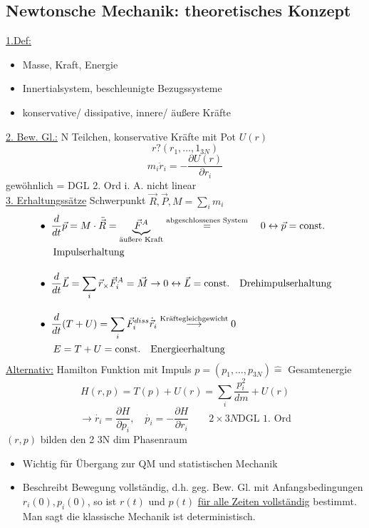 \documentclass[titlepage,12pt,a4paper,ngerman]{report}
\begin{document}
{\subsection*{Newtonsche Mechanik: theoretisches Konzept}
\underline{1.Def:}
\begin{itemize}
	\item Masse, Kraft, Energie
	\item Innertialsystem, beschleunigte Bezugssysteme
	\item konservative/ dissipative, innere/ äußere Kräfte
\end{itemize}
\underline{2. Bew. Gl.:}
N Teilchen, konservative Kräfte mit Pot $U(r)$
$$ r ? (r_1, \dots, 1_{3N})$$
$$m_i\ddot{r}_i = - \frac{\partial U(r)}{\partial r_i}$$ 
gewöhnlich = DGL 2. Ord i. A. nicht linear\\
\underline{3. Erhaltungssätze}
Schwerpunkt $\vec{R}, \vec{P}, M = \sum_i m_i$
\begin{align*}
&\bullet \ \frac{d}{dt} \vec{p} = M \cdot \ddot{\vec{R}} = \underbrace{\vec{F}^A} _{\textrm{äußere Kraft}} \buildrel \textrm{abgeschlossenes System} \over = \quad 0 \leftrightarrow \vec{p} = \textrm{const.} \\
&\indent \textrm{Impulserhaltung}\\[10pt]
&\bullet \ \frac{d}{dt} \vec{L} = \sum_i \vec{r}_ \times \vec{F}_i^A = \vec{M} \rightarrow 0 \leftrightarrow \vec{L} = \textrm{const.} \quad \textrm{Drehimpulserhaltung}\\[10pt]
&\bullet \ \frac{d}{dt} (T + U) = \sum_i \vec{F}_i^{diss} \dot{\vec{r}}_i \buildrel\textrm{Kräftegleichgewicht} \over \longrightarrow 0\\
&\indent E = T+U = \textrm{const.} \quad \textrm{Energieerhaltung}
\end{align*}
\underline{Alternativ:}
Hamilton Funktion mit Impuls $p=(p_1,\dots, p_{3N}) \widehat{=}$ Gesamtenergie
$$H(r,p) = T(p) + U(r) = \sum_i \frac{p_i^2}{dm} + U(r)$$
$$\rightarrow \dot{r_i} = \frac{\partial H}{\partial p_i}, \quad \dot{p_i}= -\frac{\partial H}{\partial r_i} \qquad 2\times 3 N \textrm{DGL 1. Ord}$$
$(r,p)$ bilden den 2 3N dim Phasenraum
\begin{itemize}
	\item Wichtig für Übergang zur QM und statistischen Mechanik
	\item Beschreibt Bewegung vollständig, d.h. geg. Bew. Gl. mit Anfangsbedingungen $r_i(0), p_i(0)$, so ist $r(t)$ und $p(t)$ \underline{für alle Zeiten vollständig} bestimmt. Man sagt die klassische Mechanik ist deterministisch.
\end{itemize}
}
\end{document}
